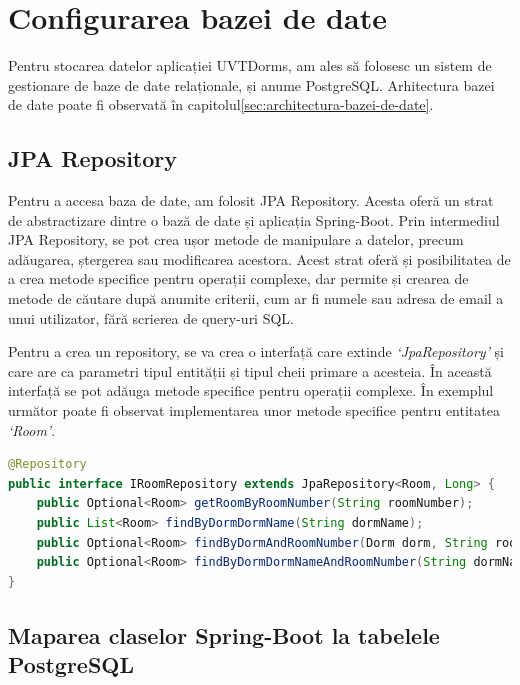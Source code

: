 \documentclass[12pt,a4paper]{report}
\theoremstyle{definition}
\theoremstyle{remark}
\begin{document}
\section{Configurarea bazei de date}

\par Pentru stocarea datelor aplicației UVTDorms, am ales să folosesc un sistem de gestionare de baze de date relaționale, și anume PostgreSQL\cite{drake2002practical}. Arhitectura bazei de date poate fi observată în capitolul\ref{sec:architectura-bazei-de-date}.

\subsection{JPA Repository}

\par Pentru a accesa baza de date, am folosit JPA Repository\cite{gierke2012spring}. Acesta oferă un strat de abstractizare dintre o bază de date și aplicația Spring-Boot. Prin intermediul JPA Repository, se pot crea ușor metode de manipulare a datelor, precum adăugarea, ștergerea sau modificarea acestora. Acest strat oferă și posibilitatea de a crea metode specifice pentru operații complexe, dar permite și crearea de metode de căutare după anumite criterii, cum ar fi numele sau adresa de email a unui utilizator, fără scrierea de query-uri SQL\@.

\par Pentru a crea un repository, se va crea o interfață care extinde \textit{`JpaRepository'} și care are ca parametri tipul entității și tipul cheii primare a acesteia. În această interfață se pot adăuga metode specifice pentru operații complexe. În exemplul următor poate fi observat implementarea unor metode specifice pentru entitatea \textit{`Room'}.

\begin{lstlisting}[language=Java, caption={Interfața JPA Repository pentru entitatea Room}]
@Repository
public interface IRoomRepository extends JpaRepository<Room, Long> {
    public Optional<Room> getRoomByRoomNumber(String roomNumber);
    public List<Room> findByDormDormName(String dormName);
    public Optional<Room> findByDormAndRoomNumber(Dorm dorm, String roomNumber);
    public Optional<Room> findByDormDormNameAndRoomNumber(String dormName, String roomNumber);
}
\end{lstlisting}

\subsection{Maparea claselor Spring-Boot la tabelele PostgreSQL}
\end{document}
